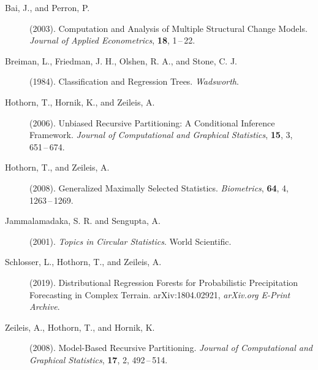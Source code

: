 \documentclass[twoside]{report}
\begin{document}
\begin{description}

\item[Bai, J., and Perron, P.] (2003).
     Computation and Analysis of Multiple Structural Change Models.
     {\it Journal of Applied Econometrics}, {\bf 18},
     1\,--\,22.     
     
\item[Breiman, L., Friedman, J. H., Olshen, R. A., and Stone, C. J.] (1984).
     Classification and Regression Trees.
     {\it Wadsworth}.

\item[Hothorn, T., Hornik, K., and Zeileis, A.] (2006).
     Unbiased Recursive Partitioning: A Conditional Inference Framework.
     {\it Journal of Computational and Graphical Statistics}, {\bf 15}, 3,
     651\,--\,674. 
     
\item[Hothorn, T., and Zeileis, A.] (2008).
     Generalized Maximally Selected Statistics.
     {\it Biometrics}, {\bf 64}, 4,
     1263\,--\,1269. 

\item[Jammalamadaka, S. R. and Sengupta, A.] (2001).
     {\it Topics in Circular Statistics}.
     World Scientific. 



\item[Schlosser, L., Hothorn, T., and Zeileis, A.] (2019).
     Distributional Regression Forests for Probabilistic Precipitation Forecasting in Complex Terrain.
     arXiv:1804.02921, {\it arXiv.org E-Print Archive}.

\item[Zeileis, A., Hothorn, T., and Hornik, K.] (2008).
     Model-Based Recursive Partitioning.
     {\it Journal of Computational and Graphical Statistics}, {\bf 17}, 2,
     492\,--\,514. 
     

\end{description}
\end{document}
